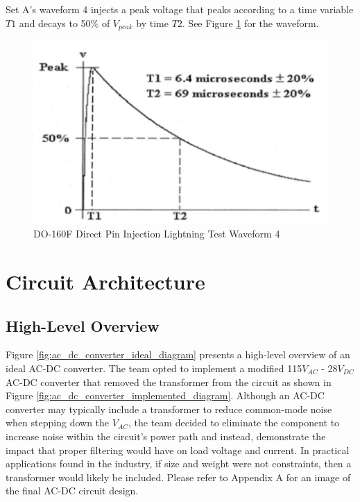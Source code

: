 \documentclass[conference]{IEEEtran}
\begin{document}
Set A's waveform 4 injects a peak voltage that peaks according to a time variable ${T1}$ and decays to 50\% of $V_{peak}$ by time ${T2}$. See Figure \ref{fig:do-160f_waveform_set_4_diagram} for the waveform.

\begin{figure}[hp]
    \centering
    \includegraphics[width=1.0\linewidth]{do-160f_waveform_set_4.png}
    \caption{DO-160F Direct Pin Injection Lightning Test Waveform 4}
    \label{fig:do-160f_waveform_set_4_diagram}
\end{figure}

\FloatBarrier

\section{Circuit Architecture}

\subsection{High-Level Overview}

Figure \ref{fig:ac_dc_converter_ideal_diagram} presents a high-level overview of an ideal AC-DC converter. The team opted to implement a modified 115$V_{AC}$ - 28$V_{DC}$ AC-DC converter that removed the transformer from the circuit as shown in Figure \ref{fig:ac_dc_converter_implemented_diagram}. Although an AC-DC converter may typically include a transformer to reduce common-mode noise when stepping down the $V_{AC}$, the team decided to eliminate the component to increase noise within the circuit's power path and instead, demonstrate the impact that proper filtering would have on load voltage and current. In practical applications found in the industry, if size and weight were not constraints, then a transformer would likely be included. Please refer to Appendix A for an image of the final AC-DC circuit design.
\end{document}
